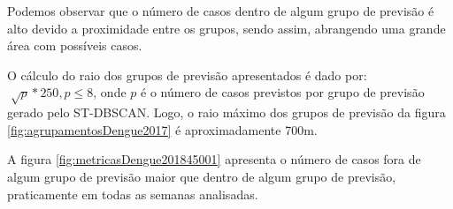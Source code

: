 Podemos observar que o número de casos dentro de algum grupo de previsão é alto devido a proximidade entre os grupos, sendo assim, abrangendo uma grande área com possíveis casos.

\begin{figure}[!ht]
	\centering
\end{figure}
\FloatBarrier

O cálculo do raio dos grupos de previsão apresentados é dado por:
${\sqrt[]{p} * 250, p \leqslant 8}$, onde ${p}$ é o número de casos previstos por grupo de previsão gerado pelo ST-DBSCAN. Logo, o raio máximo dos grupos de previsão da figura \ref{fig:agrupamentosDengue2017} é aproximadamente 700m.

A figura \ref{fig:metricasDengue201845001} apresenta o número de casos fora de algum grupo de previsão maior que dentro de algum grupo de previsão, praticamente em todas as semanas analisadas.
\begin{figure}[!ht]
	\centering	
\end{figure}
\FloatBarrier

